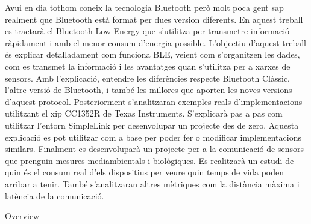 \documentclass[catalan,final]{setup/eetac_tfc_pfc}
\begin{document}

\beforepreface


\begin{resum}{10cm}
Avui en dia tothom coneix la tecnologia Bluetooth però molt poca gent sap realment que Bluetooth està format per dues version diferents.
En aquest treball es tractarà el Bluetooth Low Energy que s'utilitza per transmetre informació ràpidament i amb el menor consum d'energia possible.
\newline
\newline
L'objectiu d'aquest treball és explicar detalladament com funciona BLE, veient com s'organitzen les dades, com es transmet la informació i les avantatges quan s'utilitza per a xarxes de sensors.
Amb l'explicació, entendre les diferències respecte Bluetooth Clàssic, l'altre versió de Bluetooth, i també les millores que aporten les noves versions d'aquest protocol.
\newline
\newline
Posteriorment s'analitzaran exemples reals d'implementacions utilitzant el xip CC1352R de Texas Instruments.
S'explicarà pas a pas com utilitzar l'entorn SimpleLink per desenvolupar un projecte des de zero.
Aquesta explicació es pot utilitzar com a base per poder fer o modificar implementacions similars.
\newline
\newline
Finalment es desenvoluparà un projecte per a la comunicació de sensors que prenguin mesures mediambientals i biològiques.
Es realitzarà un estudi de quin és el consum real d'els dispositius per veure quin temps de vida poden arribar a tenir.
També s'analitzaran altres mètriques com la distància màxima i latència de la comunicació.
\end{resum}

\begin{overview}{11cm}
Overview
\end{overview}

\end{document}
